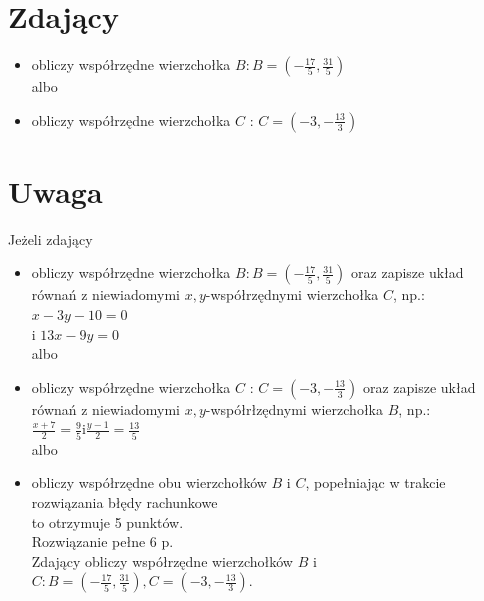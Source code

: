 \documentclass[10pt]{article}
\begin{document}
\section*{Zdający}
\begin{itemize}
  \item obliczy współrzędne wierzchołka $B: B=\left(-\frac{17}{5}, \frac{31}{5}\right)$\\
albo
  \item obliczy współrzędne wierzchołka $C$ : $C=\left(-3,-\frac{13}{3}\right)$
\end{itemize}

\section*{Uwaga}
Jeżeli zdający

\begin{itemize}
  \item obliczy współrzędne wierzchołka $B: B=\left(-\frac{17}{5}, \frac{31}{5}\right)$ oraz zapisze układ równań z niewiadomymi $x, y$-współrzędnymi wierzchołka $C$, np.: $x-3 y-10=0$\\
i $13 x-9 y=0$\\
albo
  \item obliczy współrzędne wierzchołka $C$ : $C=\left(-3,-\frac{13}{3}\right)$ oraz zapisze układ równań z niewiadomymi $x, y$-współrłzędnymi wierzchołka $B$, np.: $\frac{x+7}{2}=\frac{9}{5} \mathrm{i} \frac{y-1}{2}=\frac{13}{5}$\\
albo
  \item obliczy współrzędne obu wierzchołków $B$ i $C$, popełniając w trakcie rozwiązania błędy rachunkowe\\
to otrzymuje 5 punktów.\\
Rozwiązanie pełne 6 p.\\
Zdający obliczy współrzędne wierzchołków $B$ i $C: B=\left(-\frac{17}{5}, \frac{31}{5}\right), C=\left(-3,-\frac{13}{3}\right)$.
\end{itemize}
\end{document}
